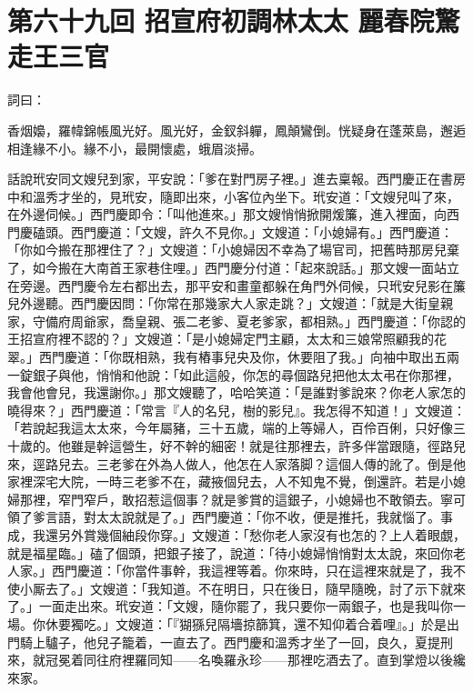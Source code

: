 
\chapter*{第六十九回 招宣府初調林太太 麗春院驚走王三官}


詞曰：

\begin{myquote} 
香烟嬝，羅幃錦帳風光好。風光好，金釵斜軃，鳳顛鸞倒。恍疑身在蓬萊島，邂逅相逢緣不小。緣不小，最開懷處，蛾眉淡掃。

\end{myquote} 

話說玳安同文嫂兒到家，平安說：「爹在對門房子裡。」進去稟報。西門慶正在書房中和溫秀才坐的，見玳安，隨即出來，小客位內坐下。玳安道：「文嫂兒叫了來，在外邊伺候。」西門慶即令：「叫他進來。」那文嫂悄悄掀開煖簾，進入裡面，向西門慶磕頭。西門慶道：「文嫂，許久不見你。」文嫂道：「小媳婦有。」西門慶道：「你如今搬在那裡住了？」文嫂道：「小媳婦因不幸為了場官司，把舊時那房兒棄了，如今搬在大南首王家巷住哩。」西門慶分付道：「起來說話。」那文嫂一面站立在旁邊。西門慶令左右都出去，那平安和畫童都躲在角門外伺候，只玳安兒影在簾兒外邊聽。西門慶因問：「你常在那幾家大人家走跳？」文嫂道：「就是大街皇親家，守備府周爺家，喬皇親、張二老爹、夏老爹家，都相熟。」西門慶道：「你認的王招宣府裡不認的？」文嫂道：「是小媳婦定門主顧，太太和三娘常照顧我的花翠。」西門慶道：「你既相熟，我有樁事兒央及你，休要阻了我。」向袖中取出五兩一錠銀子與他，悄悄和他說：「如此這般，你怎的尋個路兒把他太太弔在你那裡，我會他會兒，我還謝你。」那文嫂聽了，哈哈笑道：「是誰對爹說來？你老人家怎的曉得來？」西門慶道：「常言『人的名兒，樹的影兒』。我怎得不知道！」文嫂道：「若說起我這太太來，今年屬豬，三十五歲，端的上等婦人，百伶百俐，只好像三十歲的。{}他雖是幹這營生，好不幹的細密！就是往那裡去，許多伴當跟隨，徑路兒來，逕路兒去。三老爹在外為人做人，他怎在人家落脚？這個人傳的訛了。倒是他家裡深宅大院，一時三老爹不在，藏掖個兒去，人不知鬼不覺，倒還許。若是小媳婦那裡，窄門窄戶，敢招惹這個事？就是爹賞的這銀子，小媳婦也不敢領去。寧可領了爹言語，對太太說就是了。」西門慶道：「你不收，便是推托，我就惱了。事成，我還另外賞幾個紬段你穿。」文嫂道：「愁你老人家沒有也怎的？上人着眼覷，就是福星臨。」磕了個頭，把銀子接了，說道：「待小媳婦悄悄對太太說，來回你老人家。」西門慶道：「你當件事幹，我這裡等着。你來時，只在這裡來就是了，我不使小厮去了。」文嫂道：「我知道。不在明日，只在後日，隨早隨晚，討了示下就來了。」一面走出來。玳安道：「文嫂，隨你罷了，我只要你一兩銀子，也是我叫你一場。你休要獨吃。」文嫂道：「『猢猻兒隔墻掠篩箕，還不知仰着合着哩』。」於是出門騎上驢子，他兒子籠着，一直去了。西門慶和溫秀才坐了一回，良久，夏提刑來，就冠冕着同往府裡羅同知——名喚羅永珍——那裡吃酒去了。直到掌燈以後纔來家。

